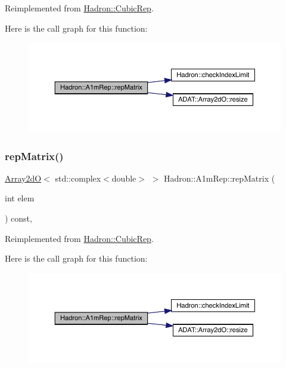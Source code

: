 Reimplemented from \mbox{\hyperlink{structHadron_1_1CubicRep_ac5d7e9e6f4ab1158b5fce3e4ad9e8005}{Hadron\+::\+Cubic\+Rep}}.

Here is the call graph for this function\+:
\nopagebreak
\begin{figure}[H]
\begin{center}
\leavevmode
\includegraphics[width=350pt]{d3/dab/structHadron_1_1A1mRep_aa82be422dc6de780227bb8c42dfeab36_cgraph}
\end{center}
\end{figure}
\mbox{\label{structHadron_1_1A1mRep_aa82be422dc6de780227bb8c42dfeab36}} 
\subsubsection{\texorpdfstring{repMatrix()}{repMatrix()}\hspace{0.1cm}{\footnotesize\ttfamily [3/3]}}
{\footnotesize\ttfamily \mbox{\hyperlink{classADAT_1_1Array2dO}{Array2dO}}$<$ std\+::complex$<$double$>$ $>$ Hadron\+::\+A1m\+Rep\+::rep\+Matrix (\begin{DoxyParamCaption}\item[{int}]{elem }\end{DoxyParamCaption}) const\hspace{0.3cm}{\ttfamily [inline]}, {\ttfamily [virtual]}}



Reimplemented from \mbox{\hyperlink{structHadron_1_1CubicRep_ac5d7e9e6f4ab1158b5fce3e4ad9e8005}{Hadron\+::\+Cubic\+Rep}}.

Here is the call graph for this function\+:
\nopagebreak
\begin{figure}[H]
\begin{center}
\leavevmode
\includegraphics[width=350pt]{d3/dab/structHadron_1_1A1mRep_aa82be422dc6de780227bb8c42dfeab36_cgraph}
\end{center}
\end{figure}


